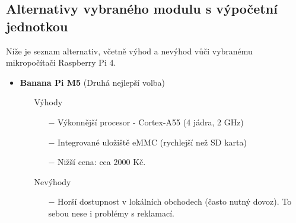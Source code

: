 \subsection{Alternativy vybraného modulu s výpočetní jednotkou}
Níže je seznam alternativ, včetně výhod a nevýhod vůči vybranému mikropočítači Raspberry Pi 4. 


\begin{itemize}
    \item \textbf{Banana Pi M5} (Druhá nejlepší volba)
        \begin{itemize}
        \item[] Výhody
            \begin{itemize}
                \item[$-$] Výkonnější procesor - Cortex-A55 (4 jádra, 2 GHz)
                \item[$-$] Integrované uložiště eMMC (rychlejší než SD karta)
                \item[$-$] Nižší cena: cca 2000 Kč.
            \end{itemize}
        \item[] Nevýhody
            \begin{itemize}
                \item[$-$] Horší dostupnost v lokálních obchodech (často nutný dovoz). To sebou nese i problémy s reklamací.

\end{itemize}
\end{itemize}
\end{itemize}
